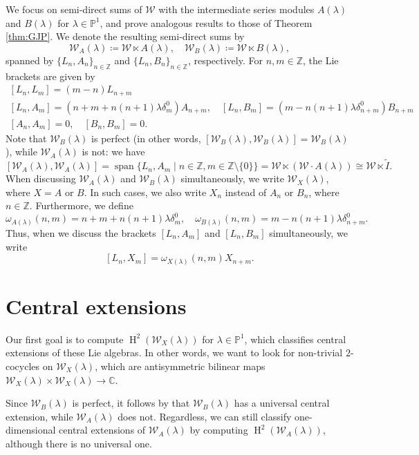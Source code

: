 \documentclass[11pt, svgnames]{amsart}
\DeclareMathOperator{\spn}{span}
\newcommand{\ZZ}{\mathbb{Z}}
\newcommand{\PP}{\mathbb{P}}
\newcommand{\W}{\mathcal{W}}
\DeclareMathOperator{\HH}{H}
\newcommand{\nonzero}{\setminus \{0\}}
\theoremstyle{definition}
\begin{document}
We focus on semi-direct sums of $\W$ with the intermediate series modules $A(\lambda)$ and $B(\lambda)$ for $\lambda \in \PP^1$, and prove analogous results to those of Theorem \ref{thm:GJP}. We denote the resulting semi-direct sums by
$$\W_A(\lambda) \coloneqq \W \ltimes A(\lambda), \quad \W_B(\lambda) \coloneqq \W \ltimes B(\lambda),$$
spanned by $\{L_n,A_n\}_{n \in \ZZ}$ and $\{L_n, B_n\}_{n \in \ZZ}$, respectively. For $n,m \in \ZZ$, the Lie brackets are given by
\begin{equation*}
    \begin{gathered}
        [L_n,L_m] = (m - n)L_{n+m} \\
        [L_n,A_m] = (n + m + n(n + 1)\lambda \delta_m^0)A_{n+m}, \quad [L_n,B_m] = (m - n(n + 1)\lambda \delta_{n+m}^0)B_{n+m} \\
        [A_n,A_m] = 0, \quad [B_n,B_m] = 0.
    \end{gathered}
\end{equation*}
Note that $\W_B(\lambda)$ is perfect (in other words, $[\W_B(\lambda),\W_B(\lambda)] = \W_B(\lambda)$), while $\W_A(\lambda)$ is not: we have 
$$[\W_A(\lambda),\W_A(\lambda)] = \spn\{L_n,A_m \mid n \in \ZZ, m \in \ZZ \nonzero\} = \W \ltimes (\W \cdot A(\lambda)) \cong \W \ltimes \widetilde{I}.$$
When discussing $\W_A(\lambda)$ and $\W_B(\lambda)$ simultaneously, we write $\W_X(\lambda)$, where $X = A$ or $B$. In such cases, we also write $X_n$ instead of $A_n$ or $B_n$, where $n \in \ZZ$. Furthermore, we define
$$\omega_{A(\lambda)}(n,m) = n + m + n(n + 1)\lambda \delta_m^0, \quad \omega_{B(\lambda)}(n,m) = m - n(n + 1)\lambda \delta_{n+m}^0.$$
Thus, when we discuss the brackets $[L_n,A_m]$ and $[L_n,B_m]$ simultaneously, we write
$$[L_n,X_m] = \omega_{X(\lambda)}(n,m)X_{n+m}.$$

\section{Central extensions}\label{sec:central extensions}

Our first goal is to compute $\HH^2(\W_X(\lambda))$ for $\lambda \in \PP^1$, which classifies central extensions of these Lie algebras. In other words, we want to look for non-trivial 2-cocycles on $\W_X(\lambda)$, which are antisymmetric bilinear maps $\W_X(\lambda) \times \W_X(\lambda)\rightarrow \mathbb{C}$.

Since $\W_B(\lambda)$ is perfect, it follows by \cite[Theorem 7.9.2]{Weibel} that $\W_B(\lambda)$ has a universal central extension, while $\W_A(\lambda)$ does not. Regardless, we can still classify one-dimensional central extensions of $\W_A(\lambda)$ by computing $\HH^2(\W_A(\lambda))$, although there is no universal one. 
\end{document}
